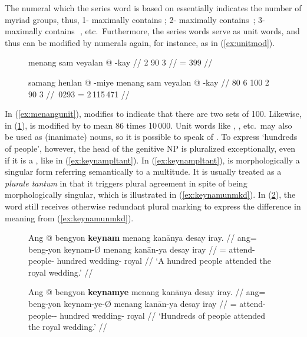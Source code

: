 The numeral which the  series word is based on essentially indicates 
the number of myriad groups, thus, 1- maximally contains 
\elv\elv\elv\elv; 2- maximally contains 
\elv\elv\elv\elv\,\elv\elv\elv\elv; 3- maximally contains 
\elv\elv\elv\elv\,\elv\elv\elv\elv\,\elv\elv\elv\elv, etc.\ Furthermore, the 
 series words serve as unit words, and thus can be modified by 
numerals again, for instance, as in (\ref{ex:unitmod}).

\begin{figure}[h]
\pex[glwordalign=center]\label{ex:unitmod}
\a\label{ex:menangunit}\begingl
	\gla menang sam veyalan @ -kay //
	 {2} {90} {3} //
	 = 399 //
\endgl

\a\label{ex:samangunit}\begingl
	\gla samang henlan @ -miye menang sam veyalan @ -kay //
	 {80} {6} {100} {2} {90} {3} //
	\,0293 = 2\,115\,471 //
\endgl
\xe
\end{figure}

In (\ref{ex:menangunit}),  modifies  to 
indicate that there are two sets of 100. Likewise, in 
(\ref{ex:samangunit}),  is modified by 
 to mean 86 times 10\,000.
Unit words like , , etc.\ may also be 
used as (inanimate) nouns, so it is possible to speak of 
.\label{hundreds} To express `hundreds of
people', however, the head of the genitive NP is pluralized exceptionally, even
if it is a , like  in
(\ref{ex:keynampltant}). In (\ref{ex:keynampltant}),  is
morphologically a singular form referring semantically to a multitude. It is
usually treated as a \textit{plurale tantum} in that it triggers plural
agreement in spite of being morphologically singular, which is illustrated in
(\ref{ex:keynamunmkd}). In (\ref{ex:keynammkd}), the word still receives
otherwise redundant plural marking to express the difference in meaning from
(\ref{ex:keynamunmkd}).

\begin{figure}[h]
\pex\label{ex:keynampltant}
\a\label{ex:keynamunmkd}\begingl
	\gla Ang @ bengyon \textbf{keynam} menang kanānya {desay iray}. //
	\glb ang= beng-yon keynam-Ø menang kanān-ya {desay iray} //
	\glc \AgtT{}= attend-\TplN{} people-\Top{} hundred wedding-\Loc{} 
		royal //
	\glft `A hundred people attended the royal wedding.' //
\endgl

\a\label{ex:keynammkd}\begingl
	\gla Ang @ bengyon \textbf{keynamye} menang kanānya {desay iray}. //
	\glb ang= beng-yon keynam-ye-Ø menang kanān-ya {desay iray} //
	\glc \AgtT{}= attend-\TplN{} people-\Pl{}-\Top{} hundred wedding-\Loc{} 
		royal //
	\glft `Hundreds of people attended the royal wedding.' //
\endgl
\xe
\end{figure}

